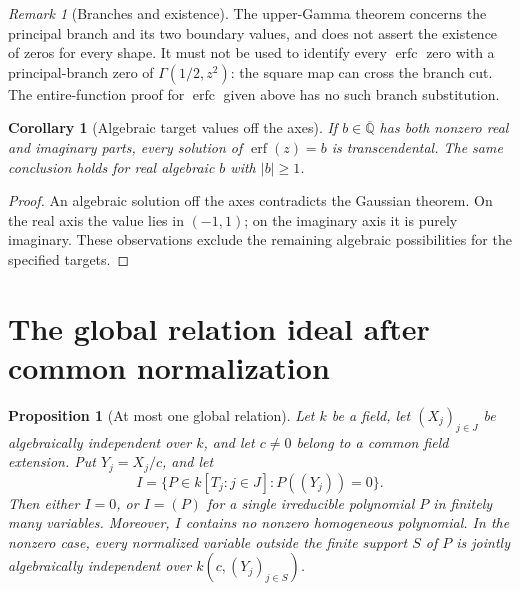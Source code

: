 \documentclass[11pt,a4paper]{article}
\newcommand{\Qbar}{\overline{\mathbb Q}}
\DeclareMathOperator{\erf}{erf}
\DeclareMathOperator{\erfc}{erfc}
\newtheorem{proposition}[theorem]{Proposition}
\newtheorem{corollary}[theorem]{Corollary}
\theoremstyle{definition}
\theoremstyle{remark}
\newtheorem{remark}[theorem]{Remark}
\numberwithin{equation}{section}
\begin{document}
\begin{remark}[Branches and existence]
The upper-Gamma theorem concerns the principal branch and its two
boundary values, and does not assert the existence of zeros for every
shape. It must not be used to identify every $\erfc$ zero with a
principal-branch zero of $\Gamma(1/2,z^2)$: the square map can cross
the branch cut. The entire-function proof for $\erfc$ given above
has no such branch substitution.
\end{remark}

\begin{corollary}[Algebraic target values off the axes]\label{norm:cor:algebraic-targets}
If $b\in\Qbar$ has both nonzero real and imaginary parts,
every solution of $\erf(z)=b$ is transcendental. The same conclusion
holds for real algebraic $b$ with $|b|\ge1$.
\end{corollary}
\begin{proof}
An algebraic solution off the axes contradicts the Gaussian theorem.
On the real axis the value lies in $(-1,1)$; on the imaginary axis
it is purely imaginary. These observations exclude the remaining
algebraic possibilities for the specified targets.
\end{proof}

\section{The global relation ideal after common normalization}

\begin{proposition}[At most one global relation]\label{norm:prop:normalization-ideal}
Let $k$ be a field, let $(X_j)_{j\in J}$ be algebraically independent
over $k$, and let $c\ne0$ belong to a common field extension.  Put
$Y_j=X_j/c$, and let
\[
 I=\{P\in k[T_j:j\in J]:P((Y_j))=0\}.
\]
Then either $I=0$, or $I=(P)$ for a single irreducible polynomial $P$
in finitely many variables.  Moreover, $I$ contains no nonzero
homogeneous polynomial.  In the nonzero case, every normalized
variable outside the finite support $S$ of $P$ is jointly algebraically
independent over $k(c,(Y_j)_{j\in S})$.
\end{proposition}
\end{document}
